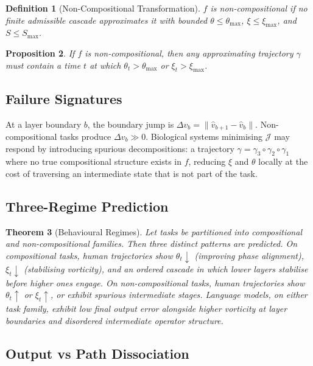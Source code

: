 \documentclass[12pt, a4paper]{article}
\newtheorem{theorem}{Theorem}[section]
\newtheorem{definition}[theorem]{Definition}
\newtheorem{proposition}[theorem]{Proposition}
\theoremstyle{remark}
\theoremstyle{definition}
\begin{document}
\begin{definition}[Non-Compositional Transformation]
$f$ is non-compositional if no finite admissible cascade approximates it with bounded
$\theta \le \theta_{\max}$, $\xi \le \xi_{\max}$, and $S \le S_{\max}$.
\end{definition}

\begin{proposition}
If $f$ is non-compositional, then any approximating trajectory $\gamma$ must contain a
time $t$ at which $\theta_t > \theta_{\max}$ or $\xi_t > \xi_{\max}$.
\end{proposition}

\subsection{Failure Signatures}

At a layer boundary $b$, the boundary jump is $\Delta v_b = \|\hat{v}_{b+1} - \hat{v}_b\|$.
Non-compositional tasks produce $\Delta v_b \gg 0$.  Biological systems minimising
$\mathcal{J}$ may respond by introducing spurious decompositions: a trajectory
$\gamma = \gamma_3 \circ \gamma_2 \circ \gamma_1$ where no true compositional structure
exists in $f$, reducing $\xi$ and $\theta$ locally at the cost of traversing an
intermediate state that is not part of the task.

\subsection{Three-Regime Prediction}

\begin{theorem}[Behavioural Regimes]
\label{thm:regimes}
Let tasks be partitioned into compositional and non-compositional families.  Then three
distinct patterns are predicted.  On compositional tasks, human trajectories show
$\theta_t \downarrow$ (improving phase alignment), $\xi_t \downarrow$ (stabilising
vorticity), and an ordered cascade in which lower layers stabilise before higher ones
engage.  On non-compositional tasks, human trajectories show $\theta_t \uparrow$ or
$\xi_t \uparrow$, or exhibit spurious intermediate stages.  Language models, on either
task family, exhibit low final output error alongside higher vorticity at layer boundaries
and disordered intermediate operator structure.
\end{theorem}

\subsection{Output vs Path Dissociation}
\end{document}
